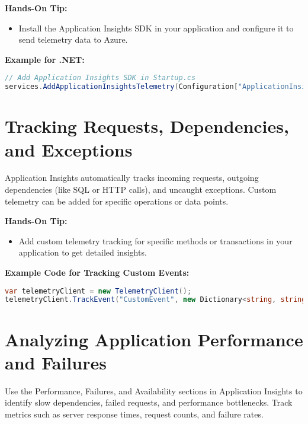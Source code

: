 \documentclass{article}
\begin{document}
\textbf{Hands-On Tip:}
\begin{itemize}
    \item Install the Application Insights SDK in your application and configure it to send telemetry data to Azure.
\end{itemize}

\textbf{Example for .NET:}
\begin{lstlisting}[language=csharp]
// Add Application Insights SDK in Startup.cs
services.AddApplicationInsightsTelemetry(Configuration["ApplicationInsights:InstrumentationKey"]);
\end{lstlisting}

\section{Tracking Requests, Dependencies, and Exceptions}
Application Insights automatically tracks incoming requests, outgoing dependencies (like SQL or HTTP calls), and uncaught exceptions. Custom telemetry can be added for specific operations or data points.

\textbf{Hands-On Tip:}
\begin{itemize}
    \item Add custom telemetry tracking for specific methods or transactions in your application to get detailed insights.
\end{itemize}

\textbf{Example Code for Tracking Custom Events:}
\begin{lstlisting}[language=csharp]
var telemetryClient = new TelemetryClient();
telemetryClient.TrackEvent("CustomEvent", new Dictionary<string, string> { { "Key", "Value" } });
\end{lstlisting}

\section{Analyzing Application Performance and Failures}
Use the Performance, Failures, and Availability sections in Application Insights to identify slow dependencies, failed requests, and performance bottlenecks. Track metrics such as server response times, request counts, and failure rates.
\end{document}
